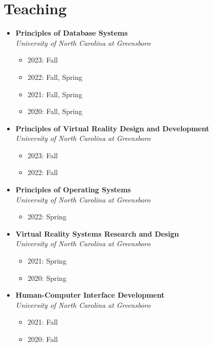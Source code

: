 \documentclass[wideaddress]{vitae}
\begin{document}
\section{Teaching}
\begin{itemize}
        \item \textbf{Principles of Database Systems}              						\\\textit{University of North Carolina at Greensboro}
        \begin{itemize}
            \item 2023: Fall
            \item 2022: Fall, Spring
            \item 2021: Fall, Spring
            \item 2020: Fall, Spring
        \end{itemize}
        \item \textbf{Principles of Virtual Reality Design and Development}        		\\\textit{University of North Carolina at Greensboro}
        \begin{itemize}
            \item 2023: Fall
            \item 2022: Fall
        \end{itemize}
        \item \textbf{Principles of Operating Systems}              					\\\textit{University of North Carolina at Greensboro}
        \begin{itemize}
            \item 2022: Spring
        \end{itemize}
        \item \textbf{Virtual Reality Systems Research and Design}              		\\\textit{University of North Carolina at Greensboro}
        \begin{itemize}
            \item 2021: Spring
            \item 2020: Spring
        \end{itemize}
        \item \textbf{Human-Computer Interface Development}		    					\\\textit{University of North Carolina at Greensboro}
        \begin{itemize}
            \item 2021: Fall
            \item 2020: Fall

\end{itemize}
\end{itemize}
\end{document}
